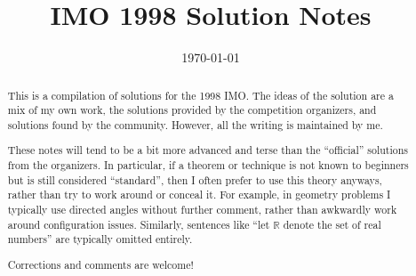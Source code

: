 \documentclass[11pt]{scrartcl}
\title{IMO 1998 Solution Notes}
\date{\today}
\begin{document}
\maketitle

\begin{abstract}
This is a compilation of solutions
for the 1998 IMO.
The ideas of the solution are a mix of my own work,
the solutions provided by the competition organizers,
and solutions found by the community.
However, all the writing is maintained by me.

These notes will tend to be a bit more advanced and terse than the ``official''
solutions from the organizers.
In particular, if a theorem or technique is not known to beginners
but is still considered ``standard'', then I often prefer to
use this theory anyways, rather than try to work around or conceal it.
For example, in geometry problems I typically use directed angles
without further comment, rather than awkwardly work around configuration issues.
Similarly, sentences like ``let $\mathbb{R}$ denote the set of real numbers''
are typically omitted entirely.

Corrections and comments are welcome!
\end{abstract}

\tableofcontents
\newpage

\addtocounter{section}{-1}
\end{document}
